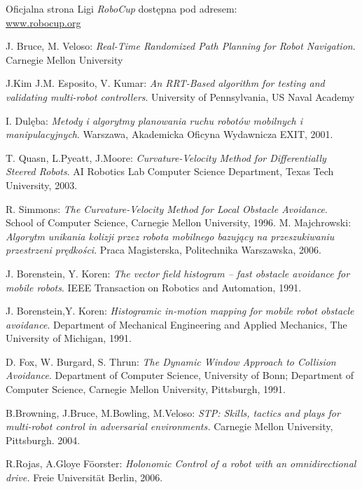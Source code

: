 \begin{thebibliography}{9}
	Oficjalna strona Ligi \textit{RoboCup} dostępna pod adresem:\\
	\url{www.robocup.org}
	
J. Bruce, M. Veloso:
\emph{Real-Time Randomized Path Planning for Robot Navigation}. Carnegie Mellon University

J.Kim J.M. Esposito, V. Kumar:
\emph{An RRT-Based algorithm for testing and validating multi-robot controllers}. University of Pennsylvania, US Naval Academy

	I. Dulęba:
	\emph{Metody i algorytmy planowania ruchu robotów mobilnych i manipulacyjnych}.
	Warszawa, Akademicka Oficyna Wydawnicza EXIT, 2001.

	T. Quasn, L.Pyeatt, J.Moore:
	\emph{Curvature-Velocity Method for Differentially Steered Robots}.
	AI Robotics Lab
	Computer Science Department,
	Texas Tech University, 2003.

	R. Simmons:
	\emph{The Curvature-Velocity Method for Local Obstacle Avoidance}.
	School of Computer Science,
	Carnegie Mellon University, 1996.
	M. Majchrowski:
	\emph{Algorytm unikania kolizji przez robota mobilnego bazujący na przeszukiwaniu
	przestrzeni prędkości}.
	Praca Magisterska, Politechnika Warszawska, 2006.

	J. Borenstein, Y. Koren:
	\emph{ The vector field histogram -- fast obstacle avoidance for mobile robots}.
	IEEE Transaction on Robotics and Automation, 1991.

	J. Borenstein,Y. Koren:
	\emph{Histogramic in-motion mapping
	for mobile robot obstacle avoidance}.
	Department of Mechanical Engineering and Applied Mechanics,
	The University of Michigan, 1991.

	D. Fox, W. Burgard, S. Thrun:
	\emph{The Dynamic Window Approach to Collision Avoidance}.
	Department of Computer Science, University of Bonn;
	Department of Computer Science, Carnegie Mellon University, Pittsburgh, 1991.
		
	B.Browning, J.Bruce, M.Bowling, M.Veloso:
	\emph{STP: Skills, tactics and plays for multi-robot control
             in adversarial environments.}
	  Carnegie Mellon University, Pittsburgh. 2004.

	R.Rojas, A.Gloye F\"{o}orster:
	\emph{ Holonomic Control of a robot with an omnidirectional
	      drive. }
	  Freie Universität Berlin, 2006.


\end{thebibliography}
